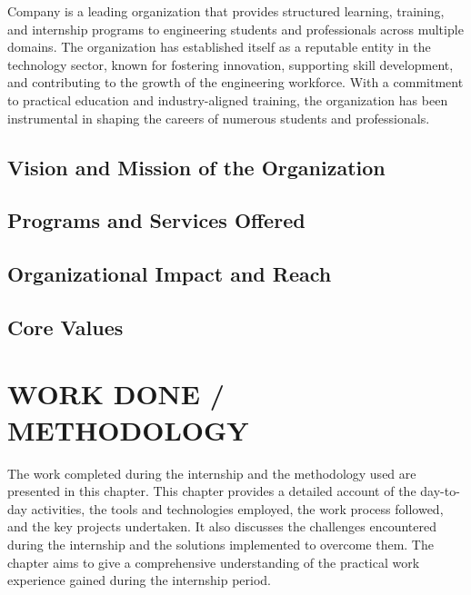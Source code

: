 \documentclass[12pt,a4paper]{report}
\begin{document}
Company is a leading organization that provides structured learning, training, and internship programs to engineering students and professionals across multiple domains. The organization has established itself as a reputable entity in the technology sector, known for fostering innovation, supporting skill development, and contributing to the growth of the engineering workforce. With a commitment to practical education and industry-aligned training, the organization has been instrumental in shaping the careers of numerous students and professionals.




\section{Vision and Mission of the Organization}


\section{Programs and Services Offered}


\section{Organizational Impact and Reach}


\section{Core Values}




\chapter{WORK DONE / METHODOLOGY}
\label{ch:work}


The work completed during the internship and the methodology used are presented in this chapter. This chapter provides a detailed account of the day-to-day activities, the tools and technologies employed, the work process followed, and the key projects undertaken. It also discusses the challenges encountered during the internship and the solutions implemented to overcome them. The chapter aims to give a comprehensive understanding of the practical work experience gained during the internship period.
\end{document}
